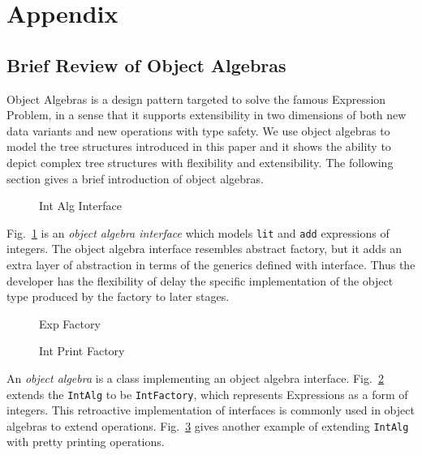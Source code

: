 \section{Appendix}\label{sec:appendix}

\clearpage
\subsection{Brief Review of Object Algebras}\label{subsec:ObjectAlgebras}

Object Algebras is a design pattern targeted to solve the famous Expression Problem, in a sense that it supports extensibility in two dimensions of both new data variants and new operations with type safety. We use object algebras to model the tree structures introduced in this paper and it shows the ability to depict complex tree structures with flexibility and extensibility. The following section gives a brief introduction of object algebras. 

\begin{figure}[t]
\nocaptionrule
\caption{Int Alg Interface}
\label{int_alg_interface}
\end{figure}

Fig.~\ref{int_alg_interface} is an \emph{object algebra interface} which models \lstinline{lit} and \lstinline{add} expressions of integers. The object algebra interface resembles abstract factory, but it adds an extra layer of abstraction in terms of the generics defined with interface. Thus the developer has the flexibility of delay the specific implementation of the object type produced by the factory to later stages. 

\begin{figure}[t]
\nocaptionrule
\caption{Exp Factory}
\label{exp_factory}
\end{figure}

\begin{figure}[t]
\nocaptionrule
\caption{Int Print Factory}
\label{int_print_factory}
\end{figure}

An \emph{object algebra} is a class implementing an object algebra interface. Fig.~\ref{exp_factory} extends the \lstinline{IntAlg} to be \lstinline{IntFactory}, which represents Expressions as a form of integers. This retroactive implementation of interfaces is commonly used in object algebras to extend operations. Fig.~\ref{int_print_factory} gives another example of extending \lstinline{IntAlg} with pretty printing operations.  

